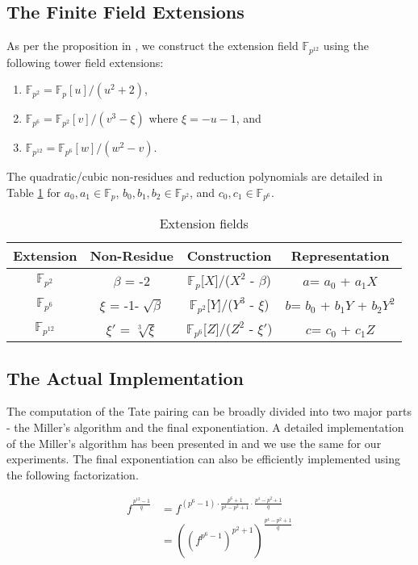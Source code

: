 \subsection{The Finite Field Extensions}

As per the proposition in \cite{devegili2007implementing}, we construct the extension field $\mathbb{F}_{p^{12}}$ using the following tower field extensions: 
\begin{enumerate}
 \item $\mathbb{F}_{p^2} = \mathbb{F}_p[u]/(u^2+2)$,
 \item $\mathbb{F}_{p^6} =\mathbb{F}_{p^2}[v]/(v^3-\xi)$ where $\xi =-u-1$, and
 \item $\mathbb{F}_{p^{12}}=\mathbb{F}_{p^6}[w]/(w^2-v)$.
\end{enumerate}

The quadratic/cubic non-residues and reduction polynomials are detailed in Table \ref{table:field_extensions} for $a_0,a_1\in \mathbb{F}_{p}$, $b_0,b_1,b_2\in\mathbb{F}_{p^2}$, and $c_0,c_1\in\mathbb{F}_{p^6}$.
\begin{table}[h!]
\captionsetup{font=scriptsize}
\caption{Extension fields}
\centering
\label{table:field_extensions}
\begin{tabular}{|c|c|c|c|}
\hline
Extension & Non-Residue & Construction & Representation \\
\hline
$\mathbb{F}_{p^2}$ & $\beta$ = -2 & $\mathbb{F}_p$[$X$]/($X^2$ - $\beta$) & $a$= $a_0$ + $a_1X$ \\
$\mathbb{F}_{p^6}$ & $\xi$ = -1-$\sqrt[]\beta$ & $\mathbb{F}_{p^2}$[$Y$]/($Y^3$ - $\xi$) & $b$= $b_0$ + $b_1Y$ + $b_2Y^2$ \\
$\mathbb{F}_{p^{12}}$ & $\xi'$ = $\sqrt[3]\xi$ & $\mathbb{F}_{p^6}$[$Z$]/($Z^2$ - $\xi'$) & $c$= $c_0$ + $c_1Z$ \\
\hline
\end{tabular}
\end{table}

\subsection{The Actual Implementation}

The computation of the Tate pairing can be broadly divided into two major parts - the Miller's algorithm and the final exponentiation. A detailed  implementation of the Miller's algorithm has been presented in \cite{ghosh2013secure} and we use the same for our experiments. The final exponentiation can also be efficiently implemented using the following factorization.

\begin{align*}
 f^{\frac{p^{12}-1}{q}} &= f^{(p^6-1)\cdot\frac{p^6+1}{p^4-p^2+1}\cdot\frac{p^4-p^2+1}{q}}\\
 &=((f^{p^6-1})^{p^2+1})^\frac{p^4-p^2+1}{q}
\end{align*}



